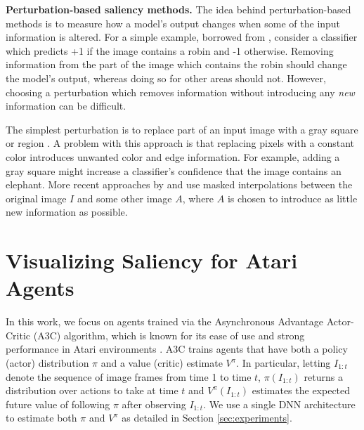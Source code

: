 \documentclass{article}
\begin{document}
\textbf{Perturbation-based saliency methods.} The idea behind perturbation-based methods is to measure how a model's output changes when some of the input information is altered. For a simple example, borrowed from \cite{Fong2017InterpretablePerturbation}, consider a classifier which predicts +1 if the image contains a robin and -1 otherwise. Removing information from the part of the image which contains the robin should change the model's output, whereas doing so for other areas should not. However, choosing a perturbation which removes information without introducing any \textit{new} information can be difficult.

The simplest perturbation is to replace part of an input image with a gray square \cite{Zeiler2014VisualizingNetworks} or region \cite{Ribeiro2016WhyClassifier}. A problem with this approach is that replacing pixels with a constant color introduces unwanted color and edge information. For example, adding a gray square might increase a classifier's confidence that the image contains an elephant. More recent approaches by \cite{Dabkowski2017RealClassifiers} and \cite{Fong2017InterpretablePerturbation} use masked interpolations between the original image $I$ and some other image $A$, where $A$ is chosen to introduce as little new information as possible.

\section{Visualizing Saliency for Atari Agents}

In this work, we focus on agents trained via the Asynchronous Advantage Actor-Critic (A3C) algorithm, which is known for its ease of use and strong performance in Atari environments \cite{Mnih2016AsynchronousLearning}. A3C trains agents that have both a policy (actor) distribution $\pi$ and a value (critic) estimate $V^{\pi}$. In particular, letting $I_{1:t}$ denote the sequence of image frames from time 1 to time $t$, $\pi(I_{1:t})$ returns a distribution over actions to take at time $t$ and $V^{\pi}(I_{1:t})$ estimates the expected future value of following $\pi$ after observing $I_{1:t}$. We use a single DNN architecture to estimate both $\pi$ and $V^{\pi}$ as detailed in Section \ref{sec:experiments}.
\end{document}
